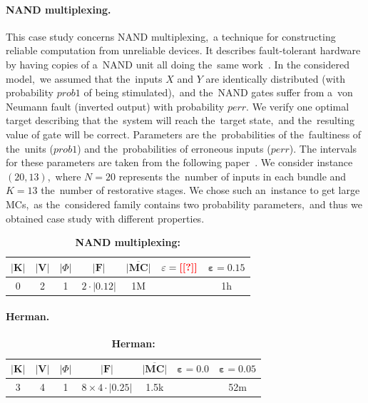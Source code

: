\paragraph{NAND multiplexing.}
This case study concerns NAND multiplexing,~a technique for constructing reliable computation from unreliable devices.
It describes fault-tolerant hardware by having copies of a~NAND unit all doing the~same work~\cite{nand}.
In the considered model,~we assumed that the~inputs $X$ and $Y$ are identically distributed (with probability $prob1$ of being stimulated),~and the~NAND gates suffer from a~von Neumann fault (inverted output) with probability $perr$.
We verify one optimal target describing that the~system will reach the~target state,~and the~resulting value of gate will be correct.
Parameters are the~probabilities of the~faultiness of the~units ($prob1$) and the~probabilities of erroneous inputs ($perr$).
The intervals for these parameters are taken from the following paper~\cite{nand}.
We consider instance $(20, 13)$,~where $N=20$ represents the~number of inputs in each bundle and $K=13$ the~number of restorative stages.
We chose such an~instance to get large MCs,~as the~considered family contains two probability parameters,~and thus we obtained case study with different properties.

\begin{table}[h!]
\centering
\begin{tabular}{|c|c|c|c|c|c|c|}
\hline
$\lvert \mathbf{K} \rvert$ & $\lvert \mathbf{V} \rvert$ & $\lvert \varPhi \rvert$ & $\lvert \mathcal{\mathbf{F}} \rvert$ & $\overline{\mathbf{\lvert MC \rvert}}$ & $\mathbf{\varepsilon = \textcolor{red}{\textbf{[[?]]}}}$ & $\mathbf{\varepsilon = 0.15}$ \\ \hline
0 & 2 & 1 & $2 \cdot \lvert 0.12 \rvert$ & 1M & \todo{?} & 1h \\ \hline
\end{tabular}
\caption{\textbf{NAND multiplexing:}}
\end{table}

\paragraph{Herman.}

\begin{table}[h!]
\centering
\begin{tabular}{|c|c|c|c|c|c|c|}
\hline
$\lvert \mathbf{K} \rvert$ & $\lvert \mathbf{V} \rvert$ & $\lvert \varPhi \rvert$ & $\lvert \mathcal{\mathbf{F}} \rvert$ & $\overline{\mathbf{\lvert MC \rvert}}$ & $\mathbf{\varepsilon = 0.0}$ & $\mathbf{\varepsilon = 0.05}$ \\ \hline
3 & 4 & 1 & $8 \times 4 \cdot \lvert 0.25 \rvert$ & 1.5k & \todo{?} & 52m \\ \hline
\end{tabular}
\caption{\textbf{Herman:}}
\end{table}

